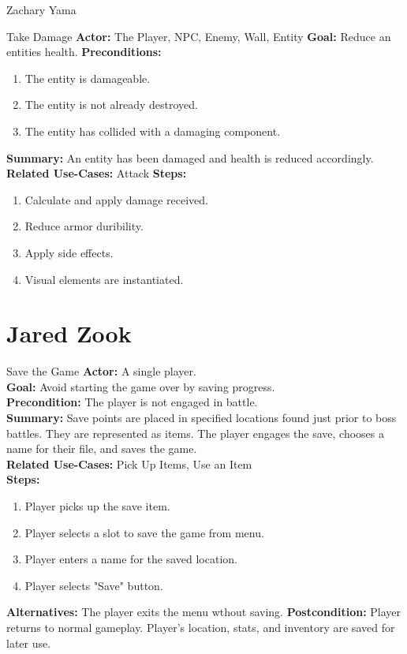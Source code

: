 \documentclass[12pt]{report}
\begin{document}
\begin{section}{Zachary Yama}
\begin{subsection}{Take Damage}
\textbf{Actor:} The Player, NPC, Enemy, Wall, Entity
\textbf{Goal:} Reduce an entities health.
\textbf{Preconditions:}
\begin{enumerate}
	\item The entity is damageable.
	\item The entity is not already destroyed.
	\item The entity has collided with a damaging component.
\end{enumerate}
\textbf{Summary:} An entity has been damaged and health is reduced accordingly.
\textbf{Related Use-Cases:} Attack
\textbf{Steps:}
\begin{enumerate}
	\item Calculate and apply damage received.
	\item Reduce armor duribility.
	\item Apply side effects.
	\item Visual elements are instantiated.
\end{enumerate}
\end{subsection}

\end{section}



\section{Jared Zook}

\begin{subsection}{Save the Game}
\textbf{Actor:} A single player. \\
\textbf{Goal:} Avoid starting the game over by saving progress. \\
\textbf{Precondition:} The player is not engaged in battle. \\
\textbf{Summary:} Save points are placed in specified locations found just prior to boss battles. They are represented as items. The player engages the save, chooses a name for their file, and saves the game.  \\
\textbf{Related Use-Cases:} Pick Up Items, Use an Item \\
\textbf{Steps:}
\begin{enumerate}
   \item Player picks up the save item.
   \item Player selects a slot to save the game from menu.
   \item Player enters a name for the saved location.
   \item Player selects "Save" button.
\end{enumerate}
\textbf{Alternatives:} The player exits the menu wthout saving.
\textbf{Postcondition:} Player returns to normal gameplay. Player's location, stats, and inventory are saved for later use.
\end{subsection}
\end{document}
